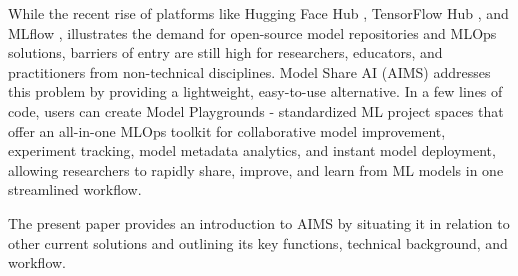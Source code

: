 While the recent rise of platforms like Hugging Face Hub \citep{noauthor_hugging_2023}, TensorFlow Hub \citep{noauthor_tensorflow_2023}, and MLflow \citep{noauthor_mlflow_2023,chen_developments_2020, zaharia_accelerating_2018}, illustrates the demand for open-source model repositories and MLOps solutions, barriers of entry are still high for researchers, educators, and practitioners from non-technical disciplines. Model Share AI (AIMS) addresses this problem by providing a lightweight, easy-to-use alternative. In a few lines of code, users can create Model Playgrounds - standardized ML project spaces that offer an all-in-one MLOps toolkit for collaborative model improvement, experiment tracking, model metadata analytics, and instant model deployment, allowing researchers to rapidly share, improve, and learn from ML models in one streamlined workflow.

The present paper provides an introduction to AIMS by situating it in relation to other current solutions and outlining its key functions, technical background, and workflow. 


